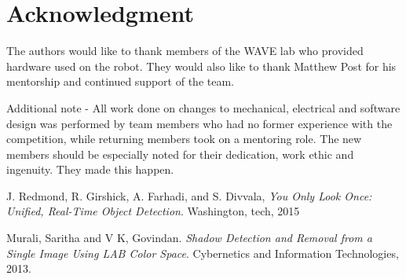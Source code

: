 \documentclass[11pt,journal]{IEEEtran}
\begin{document}
\section*{Acknowledgment}

The authors would like to thank members of the WAVE lab who provided hardware used on the robot. They would also like to thank Matthew Post for his mentorship and continued support of the team.

Additional note - All work done on changes to mechanical, electrical and software design was performed by team members who had no former experience with the competition, while returning members took on a mentoring role. The new members should be especially noted for their dedication, work ethic and ingenuity. They made this happen.

\ifCLASSOPTIONcaptionsoff
  \newpage
\fi





%
%
%
\begin{thebibliography}{2}

J. Redmond, R. Girshick, A. Farhadi, and S. Divvala, \emph{You Only Look Once: Unified, Real-Time Object Detection}. Washington, tech, 2015

Murali, Saritha and V K, Govindan. \emph{Shadow Detection and Removal from a Single Image Using LAB Color Space}. Cybernetics and Information Technologies, 2013. 
\end{thebibliography}
\end{document}
